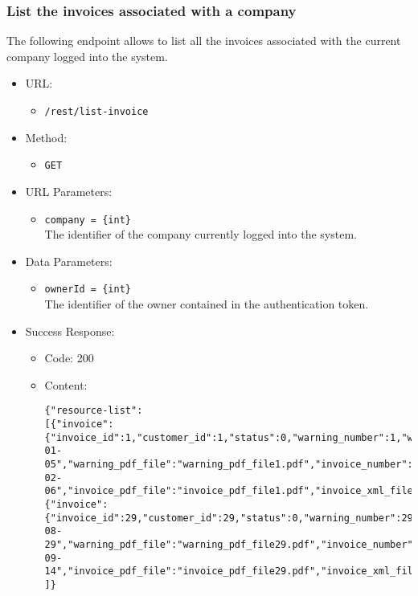\begin{itemize}
\end{itemize}


\newpage
\subsubsection*{List the invoices associated with a company}

The following endpoint allows to list all the invoices associated with the current company logged into the system.

\begin{itemize}
    
    \item URL: 
    \begin{itemize}
        \item \texttt{/rest/list-invoice}
    \end{itemize}
    
    \item Method: 
    \begin{itemize}
        \item \texttt{GET}
    \end{itemize}
    
    \item URL Parameters: 
    \begin{itemize}
        \item \texttt{company = \{int\}} \\
        The identifier of the company currently logged into the system.
    \end{itemize}
    
    \item Data Parameters: 
    \begin{itemize}
        \item \texttt{ownerId = \{int\}} \\
        The identifier of the owner contained in the authentication token.
    \end{itemize}
    
    \item Success Response: 
    \begin{itemize}
        \item Code: 200
        \item Content:
        \begin{lstlisting}
{"resource-list":
[{"invoice":{"invoice_id":1,"customer_id":1,"status":0,"warning_number":1,"warning_date":"2022-01-05","warning_pdf_file":"warning_pdf_file1.pdf","invoice_number":"1","invoice_date":"2022-02-06","invoice_pdf_file":"invoice_pdf_file1.pdf","invoice_xml_file":"invoice_xml_file1.xml","total":168.3,"discount":15.0,"pension_fund_refund":4.1,"has_stamp":false}},
{"invoice":{"invoice_id":29,"customer_id":29,"status":0,"warning_number":29,"warning_date":"2022-08-29","warning_pdf_file":"warning_pdf_file29.pdf","invoice_number":"29","invoice_date":"2022-09-14","invoice_pdf_file":"invoice_pdf_file29.pdf","invoice_xml_file":"invoice_xml_file29.xml","total":846.8,"discount":75.4,"pension_fund_refund":1.2,"has_stamp":false}}
]}
        \end{lstlisting}    
    \end{itemize}
    

\end{itemize}
